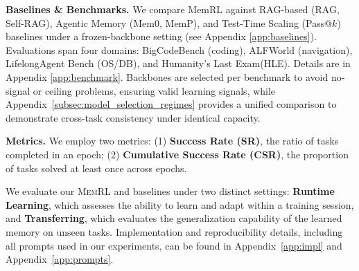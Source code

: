 \documentclass{article}
\theoremstyle{plain}
\theoremstyle{definition}
\theoremstyle{remark}
\begin{document}
\textbf{Baselines \& Benchmarks.} We compare MemRL against RAG-based (RAG, Self-RAG), Agentic Memory (Mem0, MemP), and Test-Time Scaling (Pass@$k$) baselines under a frozen-backbone setting (see Appendix \ref{app:baselines}). Evaluations span four domains: BigCodeBench (coding), ALFWorld (navigation), LifelongAgent Bench (OS/DB), and Humanity's Last Exam(HLE). Details are in Appendix \ref{app:benchmark}. Backbones are selected per benchmark to avoid no-signal or ceiling problems, ensuring valid learning signals, while Appendix~\ref{subsec:model_selection_regimes} provides a unified comparison to demonstrate cross-task consistency under identical capacity. 

\textbf{Metrics.} We employ two metrics: (1) \textbf{Success Rate (SR)}, the ratio of tasks completed in an epoch; (2) \textbf{Cumulative Success Rate (CSR)}, the proportion of tasks solved at least once across epochs.

We evaluate our \textsc{MemRL} and baselines under two distinct settings: \textbf{Runtime Learning}, which assesses the ability to learn and adapt within a training session, and \textbf{Transferring}, which evaluates the generalization capability of the learned memory on unseen tasks. Implementation and reproducibility details, including all prompts used in our experiments, can be found in Appendix~\ref{app:impl} and Appendix~\ref{app:prompts}.
\end{document}
